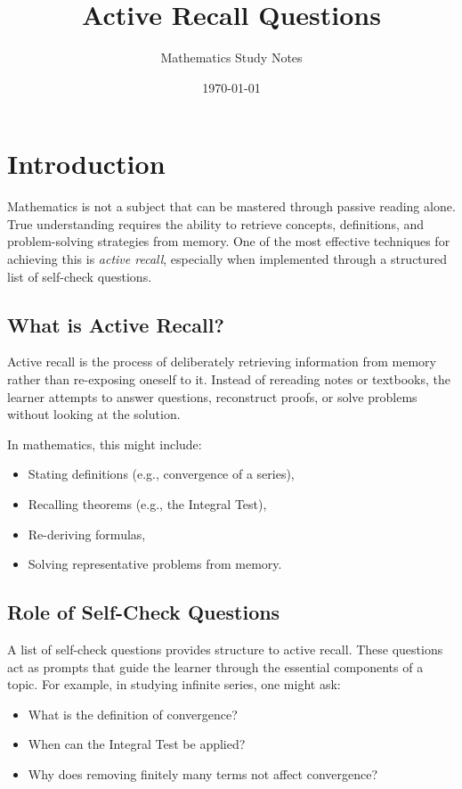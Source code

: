\documentclass{article}
\title{Active Recall Questions}
\author{Mathematics Study Notes}
\date{\today}
\begin{document}
\maketitle

\section{Introduction}

Mathematics is not a subject that can be mastered through passive reading alone. True understanding requires the ability to retrieve concepts, definitions, and problem-solving strategies from memory. One of the most effective techniques for achieving this is \emph{active recall}, especially when implemented through a structured list of self-check questions.

\subsection{What is Active Recall?}

Active recall is the process of deliberately retrieving information from memory rather than re-exposing oneself to it. Instead of rereading notes or textbooks, the learner attempts to answer questions, reconstruct proofs, or solve problems without looking at the solution.

In mathematics, this might include:
\begin{itemize}
  \item Stating definitions (e.g., convergence of a series),
  \item Recalling theorems (e.g., the Integral Test),
  \item Re-deriving formulas,
  \item Solving representative problems from memory.
\end{itemize}

\subsection{Role of Self-Check Questions}

A list of self-check questions provides structure to active recall. These questions act as prompts that guide the learner through the essential components of a topic. For example, in studying infinite series, one might ask:
\begin{itemize}
  \item What is the definition of convergence?
  \item When can the Integral Test be applied?
  \item Why does removing finitely many terms not affect convergence?
\end{itemize}
\end{document}
